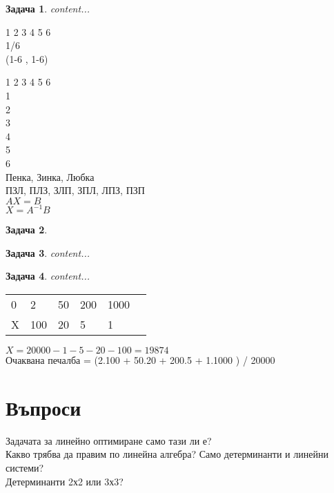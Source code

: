 \documentclass{article}
\newtheorem{problem}{Задача}
\begin{document}
	
	\begin{problem}
		content...
	\end{problem}
	
	
	1 2 3 4 5 6\\

	1/6\\
	
	(1-6 , 1-6)
	
	1 2 3 4 5 6\\
1	\\
2   \\
3 \\
4\\
5\\
6\\

Пенка, Зинка, Любка \\
ПЗЛ, ПЛЗ, ЗЛП, ЗПЛ, ЛПЗ, ПЗП \\

	
	
	$AX = B $\\
	
	$X = A^{-1} B$
	
	
	
	\begin{problem}
		
	\end{problem}
	
		\begin{problem}
		content...
	\end{problem}

		\begin{problem}
		content...
	\end{problem}
	
	\begin{table}[]
		\begin{tabular}{llllll}
			0& 2&  50&  200&  1000&  \\
			X& 100&  20&  5&  1&  \\
		\end{tabular}
	\end{table}
	$ X = 20000- 1-5-20-100 = 19874$\\
	
	Очаквана печалба = (2.100 + 50.20 + 200.5 + 1.1000 ) / 20000
	
	
	
	\section{Въпроси}
	Задачата за линейно оптимиране само тази ли е? \\
	Какво трябва да правим по линейна алгебра? Само детерминанти и линейни системи?\\
	Детерминанти 2х2 или 3х3?\\
	
	
	
	
	
\end{document}
